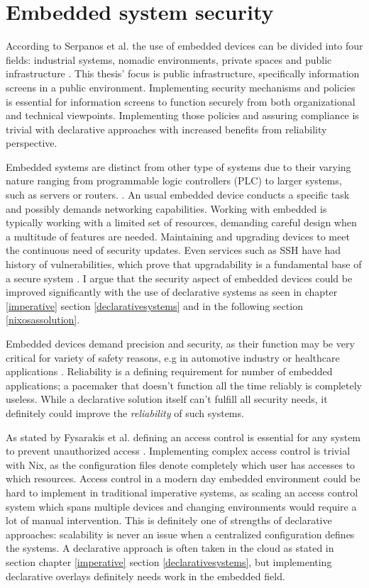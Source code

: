 \chapter{Embedded system security} \label{embedded}

According to Serpanos et al. the use of embedded devices can be
divided into four fields: industrial systems, nomadic environments,
private spaces and public infrastructure
\cite{serpanos2013security}. This thesis' focus is public
infrastructure, specifically information screens in a public
environment. Implementing security mechanisms and policies is
essential for information screens to function securely from both
organizational and technical viewpoints. Implementing those policies
and assuring compliance is trivial with declarative approaches with
increased benefits from reliability perspective.

Embedded systems are distinct from other type of systems due to their
varying nature ranging from programmable logic controllers (PLC) to
larger systems, such as servers or
routers. \cite{fysarakis2014embedded}. An usual embedded device
conducts a specific task and possibly demands networking
capabilities. Working with embedded is typically working with a limited set of
resources, demanding careful design when a multitude of features
are needed. Maintaining and upgrading devices to meet the continuous need
of security updates. Even services such as SSH have had history of
vulnerabilities, which prove that upgradability is a fundamental base
of a secure system \cite{secopsolutionHistorySecOps}. I argue that the
security aspect of embedded devices could be improved significantly
with the use of declarative systems as seen in chapter
\ref{imperative} section \ref{declarativesystems} and in the following
section \ref{nixosassolution}.

Embedded devices demand precision and security, as their function may
be very critical for variety of safety reasons, e.g in automotive
industry or healthcare applications \cite{turab2019secure,
  fysarakis2014embedded}. Reliability is a defining requirement for
number of embedded applications; a pacemaker that doesn't function all
the time reliably is completely useless. While a declarative solution
itself can't fulfill all security needs, it definitely could improve
the \textit{reliability} of such systems.

As stated by Fysarakis et al. defining an access control is essential
for any system to prevent unauthorized access
\cite{fysarakis2014embedded}. Implementing complex access control is
trivial with Nix, as the configuration files denote completely which
user has accesses to which resources. Access control in a modern day
embedded environment could be hard to implement in traditional
imperative systems, as scaling an access control system which spans
multiple devices and changing environments would require a lot of
manual intervention. This is definitely one of strengths of
declarative approaches: scalability is never an issue when a
centralized configuration defines the systems. A declarative approach
is often taken in the cloud as stated in section chapter
\ref{imperative} section \ref{declarativesystems}, but implementing
declarative overlays definitely needs work in the embedded field.

